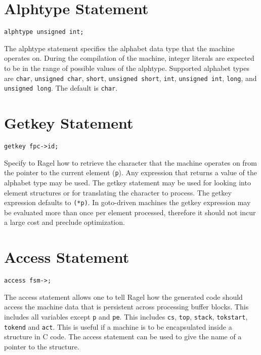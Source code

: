 \documentclass[letterpaper,11pt,oneside]{book}
\newcommand{\verbspace}{\vspace{10pt}}
\begin{document}
\section{Alphtype Statement}

\begin{verbatim}
alphtype unsigned int;
\end{verbatim}
\verbspace

The alphtype statement specifies the alphabet data type that the machine
operates on. During the compilation of the machine, integer literals are expected to
be in the range of possible values of the alphtype.  Supported alphabet types
are \verb|char|, \verb|unsigned char|, \verb|short|, \verb|unsigned short|,
\verb|int|, \verb|unsigned int|, \verb|long|, and \verb|unsigned long|. 
The default is \verb|char|.

\section{Getkey Statement}

\begin{verbatim}
getkey fpc->id;
\end{verbatim}
\verbspace

Specify to Ragel how to retrieve the character that the machine operates on
from the pointer to the current element (\verb|p|). Any expression that returns
a value of the alphabet type
may be used. The getkey statement may be used for looking into element
structures or for translating the character to process. The getkey expression
defaults to \verb|(*p)|. In goto-driven machines the getkey expression may be
evaluated more than once per element processed, therefore it should not incur a
large cost and preclude optimization.

\section{Access Statement}

\begin{verbatim}
access fsm->;
\end{verbatim}
\verbspace

The access statement allows one to tell Ragel how the generated code should
access the machine data that is persistent across processing buffer blocks.
This includes all variables except \verb|p| and \verb|pe|. This includes
\verb|cs|, \verb|top|, \verb|stack|, \verb|tokstart|, \verb|tokend| and \verb|act|.
This is useful if a machine is to be encapsulated inside a
structure in C code. The access statement can be used to give the name of
a pointer to the structure.
\end{document}
